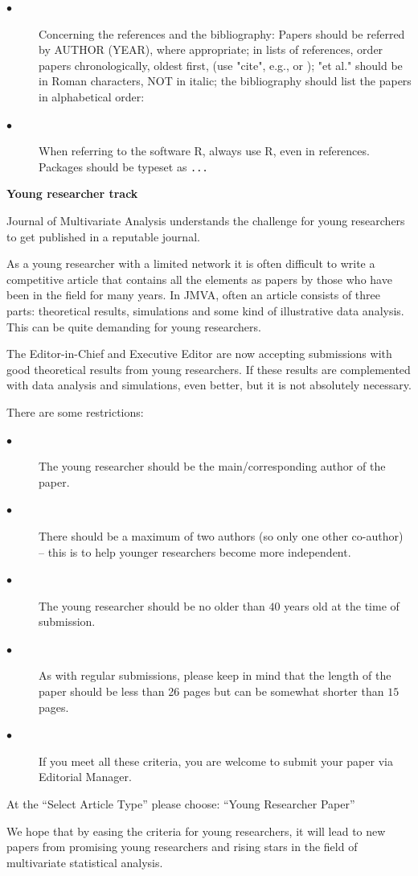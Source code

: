 \documentclass[a4paper,fleqn]{cas-sc} %
\begin{document}
\begin{description}
\item[$\bullet$] Concerning the references and the bibliography:
Papers should be referred by AUTHOR (YEAR), where appropriate;
in lists of references, order papers chronologically, oldest first, (use "cite", e.g., \cite{anderson1993totally} or \cite{andersson,lauritzen1996graphical,gratzer2002general}); "et al." should be in Roman characters, NOT in italic; the bibliography should list the papers in alphabetical order:
\item[$\bullet$] When referring to the software R, always use \textsf{R}, even in references. Packages should be typeset as \texttt{...}
\end{description}

\newpage
\centerline{\Large{\textbf{Young researcher track}}}
\smallskip
Journal of Multivariate Analysis understands the challenge for young researchers to get published in a reputable journal.

As a young researcher with a limited network it is often difficult to write a competitive article that contains all the elements as papers by those who have been in the field for many years. In JMVA, often an article consists of three parts: theoretical results, simulations and some kind of illustrative data analysis. This can be quite demanding for young researchers.

The Editor-in-Chief and Executive Editor are now accepting submissions with good theoretical results from young researchers. If these results are complemented with data analysis and simulations, even better, but it is not absolutely necessary.


There are some restrictions:
\begin{description}
\item[$\bullet$] The young researcher should be the main/corresponding author of the paper.
\item[$\bullet$]  There should be a maximum of two authors (so only one other co-author) – this is to help younger researchers become more independent.
\item[$\bullet$]  The young researcher should be no older than $40$ years old at the time of submission.
\item[$\bullet$]  As with regular submissions, please keep in mind that the length of the paper should be less than 26 pages but can be somewhat shorter than $15$ pages.
\item[$\bullet$] If you meet all these criteria, you are welcome to submit your paper via Editorial Manager.
\end{description}
At the “Select Article Type” please choose: “Young Researcher Paper”

We hope that by easing the criteria for young researchers, it will lead to new papers from promising young researchers and rising stars in the field of multivariate statistical analysis.
\end{document}
